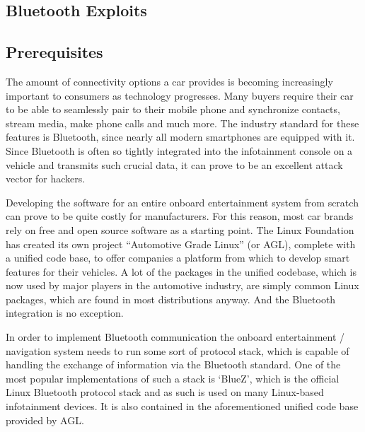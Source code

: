 \begin{itemize}
\section{Bluetooth Exploits}
\subsection{Prerequisites}
The amount of connectivity options a car provides is becoming increasingly important to consumers as technology progresses. Many buyers require their car to be able to seamlessly pair to their mobile phone and synchronize contacts, stream media, make phone calls and much more. The industry standard for these features is Bluetooth, since nearly all modern smartphones are equipped with it. Since Bluetooth is often so tightly integrated into the infotainment console on a vehicle and transmits such crucial data, it can prove to be an excellent attack vector for hackers.

Developing the software for an entire onboard entertainment system from scratch can prove to be quite costly for manufacturers. For this reason, most car brands rely on free and open source software as a starting point. The Linux Foundation has created its own project ``Automotive Grade Linux'' (or AGL), complete with a unified code base, to offer companies a platform from which to develop smart features for their vehicles. A lot of the packages in the unified codebase, which is now used by major players in the automotive industry, are simply common Linux packages, which are found in most distributions anyway. And the Bluetooth integration is no exception.\cite{linuxcar}

In order to implement Bluetooth communication the onboard entertainment / navigation system needs to run some sort of protocol stack, which is capable of handling the exchange of information via the Bluetooth standard. One of the most popular implementations of such a stack is `BlueZ'\cite{bluez}, which is the official Linux Bluetooth protocol stack and as such is used on many Linux-based infotainment devices. It is also contained in the aforementioned unified code base provided by AGL. 



\end{itemize}
